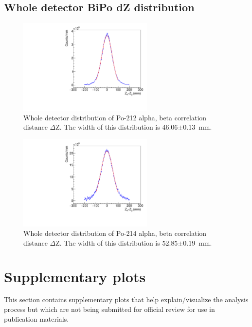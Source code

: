 \subsection{Whole detector BiPo dZ distribution}
\begin{figure}[!h]
\centering
\includegraphics[width=0.6\textwidth]{figures/PubBiPo212dZ.pdf}
\caption{\label{fig:Z212}Whole detector distribution of Po-212 alpha, beta correlation distance $\Delta$Z. The width of this distribution is 46.06$\pm$0.13~mm.}
\end{figure}
\begin{figure}[!h]
\centering
\includegraphics[width=0.6\textwidth]{figures/PubBiPo214dZ.pdf}
\caption{\label{fig:Z214}Whole detector distribution of Po-214 alpha, beta correlation distance $\Delta$Z. The width of this distribution is 52.85$\pm$0.19~mm.}
\end{figure}
\newpage

\FloatBarrier

\section{Supplementary plots\label{sec:supp}}

This section contains supplementary plots that help explain/visualize the analysis process but which are not being submitted for official review for use in publication materials.

